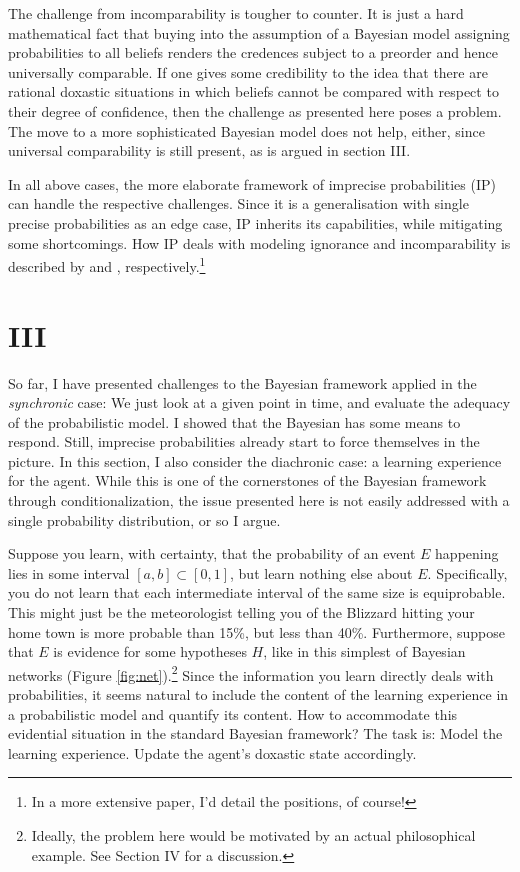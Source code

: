 \documentclass[11pt, a4paper]{scrartcl}
\begin{document}
The challenge from incomparability is tougher to counter. It is just a hard mathematical fact that buying into the assumption of a Bayesian model assigning probabilities to all beliefs renders the credences subject to a preorder and hence universally comparable. If one gives some credibility to the idea that there are rational doxastic situations in which beliefs cannot be compared with respect to their degree of confidence, then the challenge as presented here poses a problem. The move to a more sophisticated Bayesian model does not help, either, since universal comparability is still present, as is argued in section III.  

In all above cases, the more elaborate framework of imprecise probabilities (IP) can handle the respective challenges. Since it is a generalisation with single precise probabilities as an edge case, IP inherits its capabilities, while mitigating some shortcomings. How IP deals with modeling ignorance and incomparability is described by \citep{Elkin} and \citep{Norton2011-NORCTB}, respectively.\footnote{In a more extensive paper, I'd detail the positions, of course!} 

\section{III}

So far, I have presented challenges to the Bayesian framework applied in the \emph{synchronic} case: We just look at a given point in time, and evaluate the adequacy of the probabilistic model. I showed that the Bayesian has some means to respond. Still, imprecise probabilities already start to force themselves in the picture. In this section, I also consider the diachronic case: a learning experience for the agent. While this is one of the cornerstones of the Bayesian framework through conditionalization, the issue presented here is not easily addressed with a single probability distribution, or so I argue. 

Suppose you learn, with certainty, that the probability of an event $E$ happening lies in some interval $[a,b] \subset [0,1]$, but learn nothing else about $E$. Specifically, you do not learn that each intermediate interval of the same size is equiprobable. This might just be the meteorologist telling you of the Blizzard hitting your home town is more probable than 15\%, but less than 40\%. Furthermore, suppose that $E$ is evidence for some hypotheses $H$, like in this simplest of Bayesian networks (Figure \ref{fig:net}).\footnote{Ideally, the problem here would be motivated by an actual philosophical example. See Section IV for a discussion.} Since the information you learn directly deals with probabilities, it seems natural to include the content of the learning experience in a probabilistic model and quantify its content. How to accommodate this evidential situation in the standard Bayesian framework? The task is: Model the learning experience. Update the agent's doxastic state accordingly. 
\end{document}
